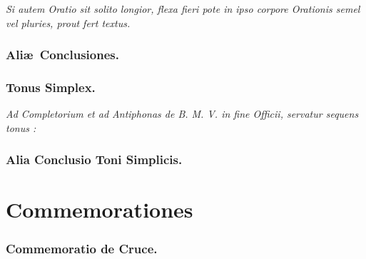 \documentclass[12pt]{article} %
\newenvironment{rubric}{\vspace{2 mm}\color{benred8} \itshape \leftskip 0in \setlength{\parindent}{0.25in}}{\vspace{2 mm}}
\begin{document}

\vspace{1mm}

\begin{rubric}
Si autem Oratio sit solito longior, flexa fieri pote in ipso corpore Orationis semel vel pluries, prout fert textus.

\end{rubric}

\subsubsection*{Ali\ae\ Conclusiones.}


\vspace*{-1.0mm}

\subsubsection*{Tonus Simplex.}

\label{OratioSimplex}

\begin{rubric}
Ad Completorium et ad Antiphonas de B. M. V. in fine Officii, servatur sequens tonus :

\end{rubric}


\subsubsection*{Alia Conclusio Toni Simplicis.}


\newpage


\section*{Commemorationes}
\label{sec:Commem}

\thispagestyle{plain}


\subsubsection*{Commemoratio de Cruce.}
\end{document}
